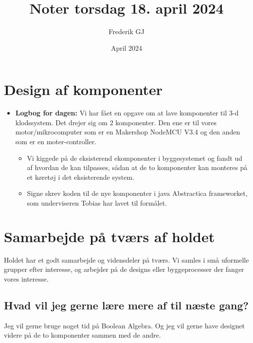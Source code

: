 \documentclass{article}
\title{Noter torsdag 18. april 2024}
\author{Frederik GJ}
\date{April 2024}
\begin{document}
\maketitle

\section{Design af komponenter}

\begin{itemize}
    \item \textbf{Logbog for dagen:} Vi har fået en opgave om at lave komponenter til 3-d klodssystem. Det drejer sig om 2 komponenter. Den ene er til vores motor/mikrocomputer som er en Makershop NodeMCU V3.4 og den anden som er en moter-controller. 
    \begin{itemize}
        \item Vi kiggede på de eksisterend ekomponenter i byggesystemet og fandt ud af hvordan de kan tilpasses, sådan at de to komponenter kan monteres på et køretøj i det eksisterende system.
        \item Signe skrev koden til de nye komponenter i java Abstractica frameworket, som underviseren Tobias har lavet til formålet.
    \end{itemize}
\end{itemize}

\section{Samarbejde på tværs af holdet}
Holdet har et godt samarbejde og vidensdeler på tværs. 
Vi samles i små uformelle grupper efter interesse, og arbejder på de designs eller byggeprocesser der fanger vores interesse. 
\subsection{Hvad vil jeg gerne lære mere af til næste gang?}
Jeg vil gerne bruge noget tid på Boolean Algebra. Og jeg vil gerne have designet videre på de to komponenter sammen med de andre. 
\end{document}
